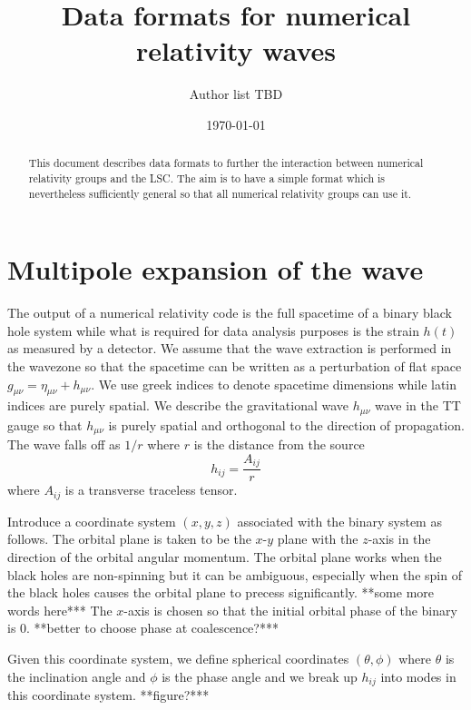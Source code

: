\documentclass[amsmath,amssymb]{article}
\begin{document}
\title{Data formats for numerical relativity waves}
\date{\today}
\author{Author list TBD}
\maketitle

\begin{abstract}
This document describes data formats to further the interaction
between numerical relativity groups and the LSC. The aim is to have a
simple format which is nevertheless sufficiently general so that all
numerical relativity groups can use it.  
\end{abstract}

\section{Multipole expansion of the wave}
\label{sec:multipoles}

The output of a numerical relativity code is the full spacetime of a
binary black hole system while what is required for data analysis
purposes is the strain $h(t)$ as measured by a detector.  We assume
that the wave extraction is performed in the wavezone so that the
spacetime can be written as a perturbation of flat space $g_{\mu\nu} =
\eta_{\mu\nu} + h_{\mu\nu}$.  We use greek indices to denote spacetime
dimensions while latin indices are purely spatial.  We describe the
gravitational wave $h_{\mu\nu}$ wave in the TT gauge so that
$h_{\mu\nu}$ is purely spatial and orthogonal to the direction of
propagation.  The wave falls off as $1/r$ where $r$ is the distance
from the source
\begin{equation}
  \label{eq:1}
  h_{ij} = \frac{A_{ij}}{r} 
\end{equation}
where $A_{ij}$ is a transverse traceless tensor.  

Introduce a coordinate system $(x,y,z)$ associated with the binary
system as follows.  The orbital plane is taken to be the $x$-$y$ plane
with the $z$-axis in the direction of the orbital angular momentum.
The orbital plane works when the black holes are non-spinning but it
can be ambiguous, especially when the spin of the black holes causes
the orbital plane to precess significantly.  **some more words here***
The $x$-axis is chosen so that the initial orbital phase of the binary
is 0.  **better to choose phase at coalescence?***

Given this coordinate system, we define spherical coordinates
$(\theta,\phi)$ where $\theta$ is the inclination angle and $\phi$ is
the phase angle and we break up $h_{ij}$ into modes in this coordinate
system. **figure?***
\end{document}
